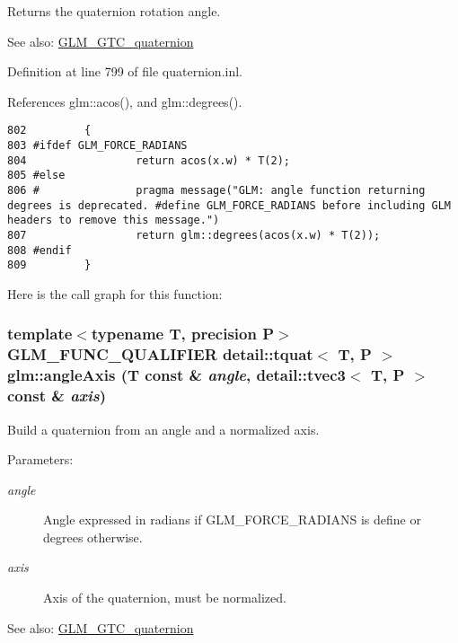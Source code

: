 Returns the quaternion rotation angle.

\begin{Desc}
\item[See also:]\hyperlink{group__gtc__quaternion}{GLM\_\-GTC\_\-quaternion} \end{Desc}


Definition at line 799 of file quaternion.inl.

References glm::acos(), and glm::degrees().

\begin{Code}\begin{verbatim}802         {
803 #ifdef GLM_FORCE_RADIANS
804                 return acos(x.w) * T(2);
805 #else
806 #               pragma message("GLM: angle function returning degrees is deprecated. #define GLM_FORCE_RADIANS before including GLM headers to remove this message.")
807                 return glm::degrees(acos(x.w) * T(2));
808 #endif
809         }
\end{verbatim}
\end{Code}




Here is the call graph for this function:\hypertarget{group__gtc__quaternion_g96dbce7a48d76fa63e65c4ba949a3bc4}{
\subsubsection[angleAxis]{\setlength{\rightskip}{0pt plus 5cm}template$<$typename T, precision P$>$ GLM\_\-FUNC\_\-QUALIFIER detail::tquat$<$ T, P $>$ glm::angleAxis (T const \& {\em angle}, \/  detail::tvec3$<$ T, P $>$ const \& {\em axis})}}
\label{group__gtc__quaternion_g96dbce7a48d76fa63e65c4ba949a3bc4}


Build a quaternion from an angle and a normalized axis.

\begin{Desc}
\item[Parameters:]
\begin{description}
\item[{\em angle}]Angle expressed in radians if GLM\_\-FORCE\_\-RADIANS is define or degrees otherwise. \item[{\em axis}]Axis of the quaternion, must be normalized.\end{description}
\end{Desc}
\begin{Desc}
\item[See also:]\hyperlink{group__gtc__quaternion}{GLM\_\-GTC\_\-quaternion} \end{Desc}


